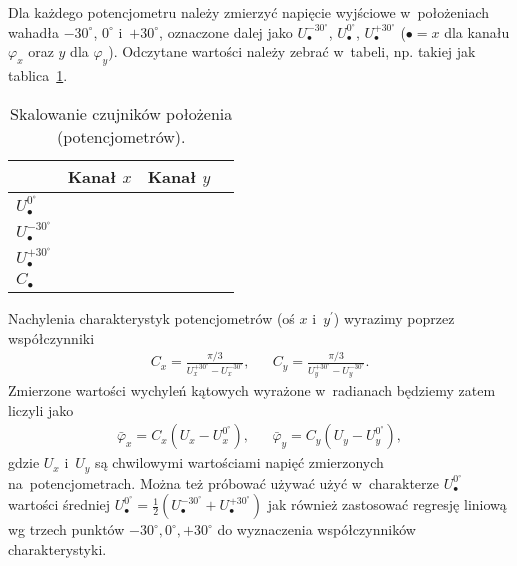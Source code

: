 \documentclass[paper=a4,DIV=12]{lpas}
\begin{document}
Dla każdego potencjometru należy zmierzyć
napięcie wyjściowe w~położeniach wahadła $-30^{\circ}$, $0^{\circ}$
i~$+30^{\circ}$, oznaczone dalej jako $U_{\bullet}^{-30^{\circ}}$,
$U_{\bullet}^{0^{\circ}}$, $U_{\bullet}^{+30^{\circ}}$ ($\bullet=x$ dla kanału
$\varphi_x$ oraz $y$ dla $\varphi_y$). Odczytane wartości należy zebrać
w~tabeli, np. takiej jak tablica~\ref{tab:KM4WU}.
\begin{table}[htbp]
  \caption{Skalowanie czujników położenia (potencjometrów).}
  \label{tab:KM4WU}
  \centering
  \begin{tabular}{|l|c|c|c|}
    \hline
                                  & Kanał $x$ & Kanał $y$ \\ \hline
      $U_{\bullet}^{0^{\circ}}$   &           &           \\ \hline
      $U_{\bullet}^{-30^{\circ}}$ &           &           \\ \hline
      $U_{\bullet}^{+30^{\circ}}$ &           &           \\ \hline
      $C_{\bullet}$               &           &           \\ \hline
  \end{tabular}
\end{table}

Nachylenia charakterystyk potencjometrów (oś $x$ i~$y^{\prime}$) wyrazimy poprzez
współczynniki
\begin{align}
  & C_x = \frac{\pi/3}{U_x^{+30^{\circ}} - U_x^{-30^{\circ}}}, &
  & C_y = \frac{\pi/3}{U_y^{+30^{\circ}} - U_y^{-30^{\circ}}}. &
  \label{eq:XIRR2}
\end{align}
Zmierzone wartości wychyleń kątowych wyrażone w~radianach będziemy zatem liczyli jako
\begin{align}
  &\bar{\varphi}_x = C_x \left(U_x - U_x^{0^{\circ}}\right),&
  &\bar{\varphi}_y = C_y \left(U_y - U_y^{0^{\circ}}\right),&
  \label{eq:547XS}
\end{align}
gdzie $U_x$ i~$U_y$ są chwilowymi wartościami napięć zmierzonych
na~potencjometrach. Można też próbować używać użyć w~charakterze
$U_{\bullet}^{0^{\circ}}$ wartości średniej $U_{\bullet}^{0^{\circ}} =
\tfrac{1}{2}\left(U_{\bullet}^{-30^{\circ}} + U_{\bullet}^{+30^{\circ}}\right)$
jak również zastosować regresję liniową wg trzech punktów $-30^{\circ},
0^{\circ}, +30^{\circ}$ do wyznaczenia współczynników charakterystyki.
\end{document}
